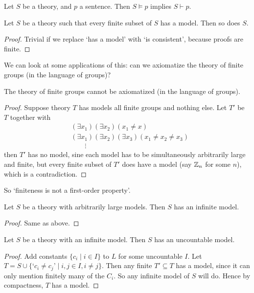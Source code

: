 \documentclass[a3paper, 10pt]{article}
\begin{document}
\begin{multicols*}{5}
\begin{corollary}
  Let $S$ be a theory, and $p$ a sentence. Then $S \models p$ implies $S \vdash p$.
\end{corollary}

\begin{corollary}
  Let $S$ be a theory such that every finite subset of $S$ has a model. Then so does $S$.
\end{corollary}
\begin{proof}
  Trivial if we replace `has a model' with `is consistent', because proofs are finite.
\end{proof}

We can look at some applications of this: can we axiomatize the theory of finite groups (in the language of groups)?

\begin{corollary}
  The theory of finite groups cannot be axiomatized (in the language of groups).
\end{corollary}
\begin{proof}
  Suppose theory $T$ has models all finite groups and nothing else. Let $T'$ be $T$ together with 
  \begin{align*}
    &(\exists x_1) (\exists x_2) (x_1 \neq x) \\
    &(\exists x_1)(\exists x_2)(\exists x_3)(x_1 \neq x_2 \neq x_3)\\
    &\quad\quad\vdots 
  \end{align*}
  then $T'$ has no model, sine each model has to be simultaneously arbitrarily large and finite, but every finite subset of $T'$ does have a model (say $\mathbb{Z}_n$ for some $n$), which is a contradiction.
\end{proof}

So `finiteness is not a first-order property'.

\begin{corollary}
  Let $S$ be a theory with arbitrarily large models.
  Then $S$ has an infinite model.
\end{corollary}
\begin{proof}
  Same as above.
\end{proof}

\begin{corollary}
  Let $S$ be a theory with an infinite model. Then $S$ has an uncountable model.
\end{corollary}
\begin{proof}
  Add constants $\{c_i \mid i \in I\}$ to $L$ for some uncountable $I$.
  Let $T = S \cup \{\text{`}c_i \neq c_j\text{'} \mid i, j \in I, i \neq j\}$.
  Then any finite $T' \subseteq T$ has a model, since it can only mention finitely many of the $C_i$. So any infinite model of $S$ will do. Hence by compactness, $T$ has a model.
\end{proof}


\end{multicols*}
\end{document}
